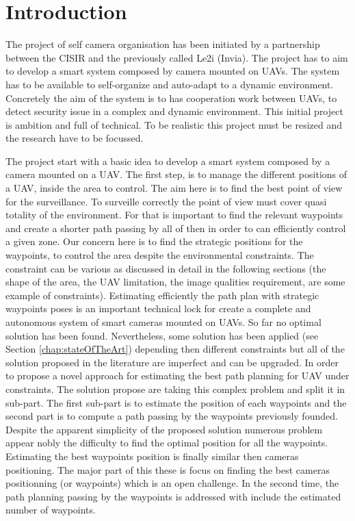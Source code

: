 \chapter{Introduction}\label{chap:Intro}

\minitoc


The project of self camera organisation has been initiated by a partnership between the CISIR and the previously called Le2i (Invia). The project has to aim to develop a smart system composed by camera mounted on UAVs. The system has to be available to self-organize and auto-adapt to a dynamic environment. Concretely the aim of the system is to has  cooperation work between UAVs, to detect security issue in a complex and dynamic environment. This initial project is ambition and full of technical. To be realistic  this project must be resized and the research have to be focussed.%

The project start with a basic idea to develop a smart system composed by a camera mounted on a UAV. 
The first step, is to manage the different positions of a UAV, inside the area to control. The aim here is to find the best point of view for the surveillance. To surveille correctly the point of view must cover  quasi totality  of  the environment.
For that is important to find the relevant waypoints and create a shorter path passing by all of then in order to can efficiently control a given zone. Our concern here is to find the strategic positions for the waypoints, to control the area despite the environmental constraints. The constraint can be various as discussed in detail in the following sections (the shape of the area, the UAV limitation, the image qualities requirement, are some example of constraints). 
Estimating efficiently the path plan with strategic waypoints poses is an important technical lock for create a complete and autonomous system of smart cameras mounted on UAVs. So far no optimal solution has been found. Nevertheless, some solution has been applied (see Section \ref{chap:stateOfTheArt}) depending then different constraints but all of the solution proposed in the literature are imperfect and can be upgraded. 
In order to propose a novel approach for estimating the best path planning for UAV under constraints. The solution  propose are taking this complex problem and split it in sub-part. 
The first sub-part is to estimate the position of each waypoints and the second part is to compute a path passing by the waypoints previously founded. Despite the apparent simplicity of the proposed solution numerous problem appear nobly the difficulty to find the optimal position for all the waypoints. 
Estimating the best waypoints position is finally similar then cameras positioning. The major part of this these is focus on finding the best cameras positionning (or waypoints) which is an open challenge. In the second time, the path planning passing by the waypoints is addressed with include the estimated number of waypoints.




